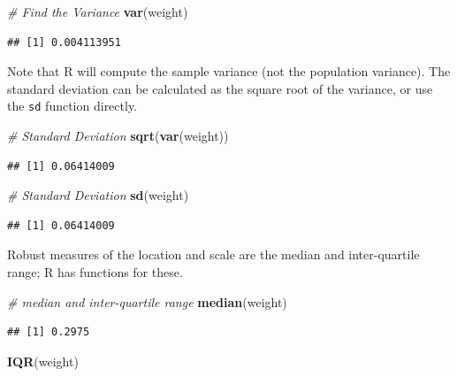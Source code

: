 \documentclass[]{book}
\newenvironment{Shaded}{\begin{snugshade}}{\end{snugshade}}
\newcommand{\CommentTok}[1]{\textcolor[rgb]{0.56,0.35,0.01}{\textit{#1}}}
\newcommand{\KeywordTok}[1]{\textcolor[rgb]{0.13,0.29,0.53}{\textbf{#1}}}
\newcommand{\NormalTok}[1]{#1}
\begin{document}
\begin{Shaded}
\begin{Highlighting}[]
\CommentTok{# Find the Variance}
\KeywordTok{var}\NormalTok{(weight)}
\end{Highlighting}
\end{Shaded}

\begin{verbatim}
## [1] 0.004113951
\end{verbatim}

Note that R will compute the sample variance (not the population variance). The standard deviation can be calculated as the square root of the variance, or use the \texttt{sd} function directly.

\begin{Shaded}
\begin{Highlighting}[]
\CommentTok{# Standard Deviation}
\KeywordTok{sqrt}\NormalTok{(}\KeywordTok{var}\NormalTok{(weight))}
\end{Highlighting}
\end{Shaded}

\begin{verbatim}
## [1] 0.06414009
\end{verbatim}

\begin{Shaded}
\begin{Highlighting}[]
\CommentTok{# Standard Deviation}
\KeywordTok{sd}\NormalTok{(weight)}
\end{Highlighting}
\end{Shaded}

\begin{verbatim}
## [1] 0.06414009
\end{verbatim}

Robust measures of the location and scale are the median and inter-quartile range; R has functions for these.

\begin{Shaded}
\begin{Highlighting}[]
\CommentTok{# median and inter-quartile range}
\KeywordTok{median}\NormalTok{(weight)}
\end{Highlighting}
\end{Shaded}

\begin{verbatim}
## [1] 0.2975
\end{verbatim}

\begin{Shaded}
\begin{Highlighting}[]
\KeywordTok{IQR}\NormalTok{(weight)}
\end{Highlighting}
\end{Shaded}
\end{document}

